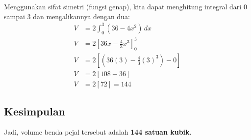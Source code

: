 Menggunakan sifat simetri (fungsi genap), kita dapat menghitung integral dari $0$ sampai $3$ dan mengalikannya dengan dua:
\begin{align*}
V &= 2 \int_{0}^{3} (36 - 4x^2) \, dx \\
V &= 2 \left[ 36x - \frac{4}{3}x^3 \right]_{0}^{3} \\
V &= 2 \left[ \left( 36(3) - \frac{4}{3}(3)^3 \right) - 0 \right] \\
V &= 2 [ 108 - 36 ] \\
V &= 2 [ 72 ] = 144
\end{align*}

\subsection*{Kesimpulan}
Jadi, volume benda pejal tersebut adalah \textbf{144 satuan kubik}.

